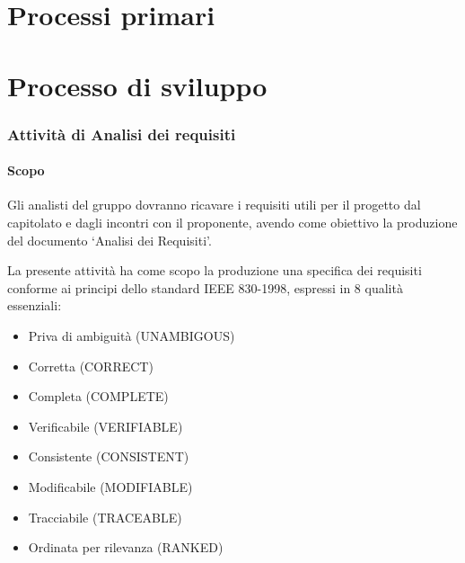 

\section{Processi primari}
	\section{Processo di sviluppo}
		\subsubsection{Attività di Analisi dei requisiti}
			\paragraph*{Scopo}
				Gli analisti del gruppo dovranno ricavare i requisiti utili per il progetto
				dal capitolato e dagli incontri con il proponente, avendo come obiettivo la
				produzione del documento `Analisi dei Requisiti'.
			
			La presente attività ha come scopo la produzione una specifica dei
			requisiti conforme ai principi dello standard IEEE 830-1998, espressi in 8 qualità
			essenziali:
				\begin{itemize}
				\item Priva di ambiguità (UNAMBIGOUS)
				\item Corretta (CORRECT)
				\item Completa (COMPLETE)
				\item Verificabile (VERIFIABLE)
				\item Consistente (CONSISTENT)
				\item Modificabile (MODIFIABLE)
				\item Tracciabile (TRACEABLE)
				\item Ordinata per rilevanza (RANKED)
				\end{itemize}
			
